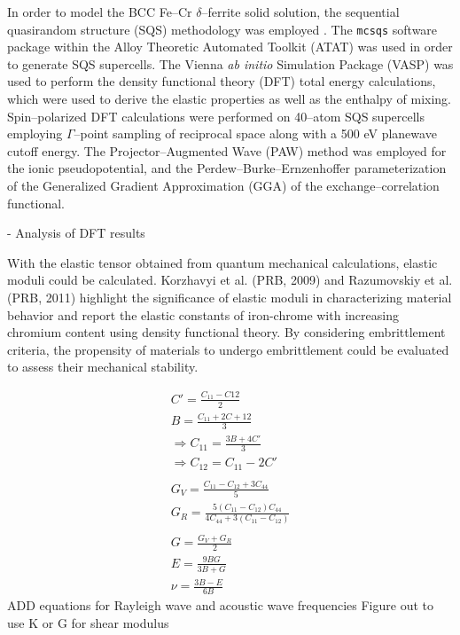 In order to model the BCC Fe--Cr $\delta$--ferrite solid solution, the sequential quasirandom structure (SQS) methodology was employed \cite{VandeWalleLiu2013}. 
The \texttt{mcsqs} software package within the Alloy Theoretic Automated Toolkit (ATAT) was used in order to generate SQS supercells.
The Vienna \textit{ab initio} Simulation Package (VASP) was used to perform the density functional theory (DFT) total energy calculations, which were used to derive the elastic properties as well as the enthalpy of mixing. 
Spin--polarized DFT calculations were performed on 40--atom SQS supercells employing $\Gamma$--point sampling of reciprocal space along with a 500 eV planewave cutoff energy. 
The Projector--Augmented Wave (PAW) method was employed for the ionic pseudopotential, and the Perdew--Burke--Ernzenhoffer parameterization of the Generalized Gradient Approximation (GGA) of the exchange--correlation functional. 

- Analysis of DFT results

With the elastic tensor obtained from quantum mechanical calculations, elastic moduli could be calculated. Korzhavyi et al. (PRB, 2009) and Razumovskiy et al. (PRB, 2011) highlight the significance of elastic moduli in characterizing material behavior and report the elastic constants of iron-chrome with increasing chromium content using density functional theory. By considering embrittlement criteria, the propensity of materials to undergo embrittlement could be evaluated to assess their mechanical stability.

\begin{eqnarray}
    C' = \frac{C_{11}-C{12}}{2} \\
    B = \frac{C_{11} + 2C+{12}}{3} \\
    \Rightarrow C_{11}= \frac{3B+4C'}{3} \\
    \Rightarrow C_{12} = C_{11} - 2 C' \\ \\
    G_V = \frac{C_{11}-C_{12} + 3C_{44}}{5} \\
    G_R = \frac{5(C_{11}-C_{12})C_{44}}{4C_{44}+3(C_{11}-C_{12})} \\ \\
    G = \frac{G_V + G_R}{2} \\
    E = \frac{9BG}{3B+G} \\
    \nu = \frac{3B-E}{6B}
\end{eqnarray}
ADD equations for Rayleigh wave and acoustic wave frequencies
Figure out to use K or G for shear modulus



